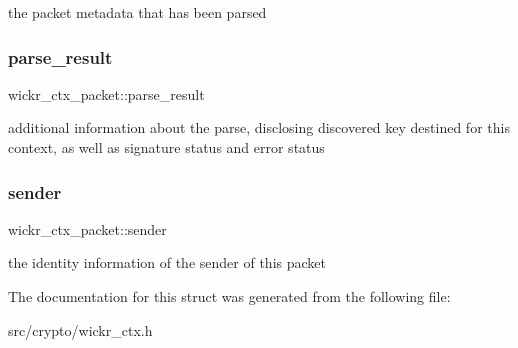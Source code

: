 the packet metadata that has been parsed \mbox{\label{structwickr__ctx__packet_a7bc4643a99b787536ee8b7505412ecce}} 
\subsubsection{\texorpdfstring{parse\+\_\+result}{parse\_result}}
{\footnotesize\ttfamily wickr\+\_\+ctx\+\_\+packet\+::parse\+\_\+result}

additional information about the parse, disclosing discovered key destined for this context, as well as signature status and error status \mbox{\label{structwickr__ctx__packet_ac57d2b0f48fc3dad5b72d408e30b7b8b}} 
\subsubsection{\texorpdfstring{sender}{sender}}
{\footnotesize\ttfamily wickr\+\_\+ctx\+\_\+packet\+::sender}

the identity information of the sender of this packet 

The documentation for this struct was generated from the following file\+:\begin{DoxyCompactItemize}
\item 
src/crypto/wickr\+\_\+ctx.\+h\end{DoxyCompactItemize}
